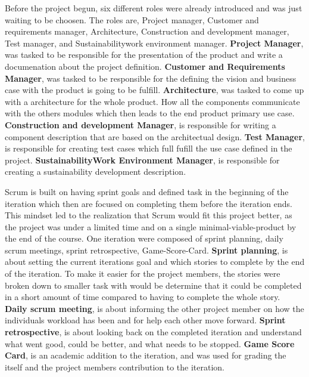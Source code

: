Before the project begun, six different roles were already introduced and was just waiting to be choosen.
The roles are, Project manager, Customer and requirements manager, Architecture, Construction and development manager, Test manager, and Sustainability\/work environment manager.
\textbf{Project Manager}, was tasked to be responsible for the presentation of the product and write a documenation about the project definition.
\textbf{Customer and Requirements Manager}, was tasked to be responsible for the defining the vision and business case with the product is going to be fulfill.
\textbf{Architecture}, was tasked to come up with a architecture for the whole product. 
How all the components communicate with the others modules which then leads to the end product primary use case.
\textbf{Construction and development Manager}, is responsible for writing a component description that are based on the architectual design.
\textbf{Test Manager}, is responsible for creating test cases which full fufill the use case defined in the project.
\textbf{Sustainability\/Work Environment Manager}, is responsible for creating a sustainability development description.


Scrum is built on having sprint goals and defined task in the beginning of the iteration which then are focused on completing them before the iteration ends.
This mindset led to the realization that Scrum would fit this project better, as the project was under a limited time and on a single minimal-viable-product by the end of the course.
One iteration were composed of sprint planning, daily scrum meetings, sprint retrospective, Game-Score-Card.
\textbf{Sprint planning}, is about setting the current iterations goal and which stories to complete by the end of the iteration. 
To make it easier for the project members, the stories were broken down to smaller task with would be determine that it could be completed in a short amount of time compared to having to complete the whole story.
\textbf{Daily scrum meeting}, is about informing the other project member on how the individuals workload has been and for help each other move forward.
\textbf{Sprint retrospective}, is about looking back on the completed iteration and understand what went good, could be better, and what needs to be stopped.
\textbf{Game Score Card}, is an academic addition to the iteration, and was used for grading the itself and the project members contribution to the iteration.